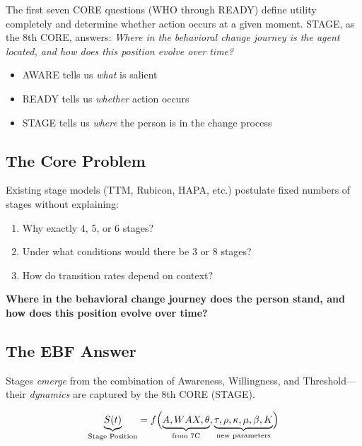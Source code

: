 The first seven CORE questions (WHO through READY) define utility completely and determine whether action occurs at a given moment. STAGE, as the 8th CORE, answers: \textit{Where in the behavioral change journey is the agent located, and how does this position evolve over time?}

\begin{itemize}
\item AWARE tells us \textit{what} is salient
\item READY tells us \textit{whether} action occurs
\item STAGE tells us \textit{where} the person is in the change process
\end{itemize}

\subsection{The Core Problem}

Existing stage models (TTM, Rubicon, HAPA, etc.) postulate fixed numbers of stages without explaining:
\begin{enumerate}
\item Why exactly 4, 5, or 6 stages?
\item Under what conditions would there be 3 or 8 stages?
\item How do transition rates depend on context?
\end{enumerate}

\begin{tcolorbox}[colback=red!5!white, colframe=red!75!black,
    title=The Fundamental Question]
\textbf{Where in the behavioral change journey does the person stand, and how does this position evolve over time?}
\end{tcolorbox}

\subsection{The EBF Answer}

Stages \textit{emerge} from the combination of Awareness, Willingness, and Threshold---their \textit{dynamics} are captured by the 8th CORE (STAGE).

\begin{equation}
\underbrace{S(t)}_{\text{Stage Position}} = f\Bigl(\underbrace{A, WAX, \theta}_{\text{from 7C}}, \underbrace{\tau, \rho, \kappa, \mu, \beta, K}_{\text{new parameters}}\Bigr)
\end{equation}


